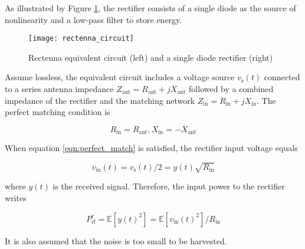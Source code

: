 As illustrated by Figure \ref{fig:rectenna_circuit}, the rectifier consists of a single diode as the source of nonlinearity and a low-pass filter to store energy.

\begin{figure}
  \centering
    \texttt{[image: rectenna\_circuit]}
  \caption{Rectenna equivalent circuit (left) and a single diode rectifier (right) \cite{Clerckx2018a}}
  \label{fig:rectenna_circuit}
\end{figure}

Assume lossless, the equivalent circuit includes a voltage source ${v_{\text{s}}}(t)$ connected to a series antenna impedance ${Z_{{\text{ant}}}} = {R_{{\text{ant}}}} + j{X_{{\text{ant}}}}$ followed by a combined impedance of the rectifier and the matching network ${Z_{{\text{in}}}} = {R_{{\text{in}}}} + j{X_{{\text{in}}}}$. The perfect matching condition is

\begin{equation}\label{eqn:perfect_match}
  {R_{{\text{in}}}} = {R_{{\text{ant}}}},{X_{{\text{in}}}} =  - {X_{{\text{ant}}}}
\end{equation}

When equation \ref{eqn:perfect_match} is satisfied, the rectifier input voltage equals

\begin{equation}\label{eqn:rectifier_input_voltage}
  {v_{{\text{in}}}}(t) = {v_{\text{s}}}(t)/2 = y(t)\sqrt {{R_{{\text{in}}}}}
\end{equation}

where ${y(t)}$ is the received signal. Therefore, the input power to the rectifier writes

\begin{equation}\label{eqn:rectifier_input_power}
  P_{{\text{rf}}}^r = \mathbb{E}\left[ {y{{(t)}^2}} \right] = \mathbb{E}\left[ {{v_{{\text{in}}}}{{(t)}^2}} \right]/{R_{{\text{in}}}}
\end{equation}

It is also assumed that the noise is too small to be harvested.
